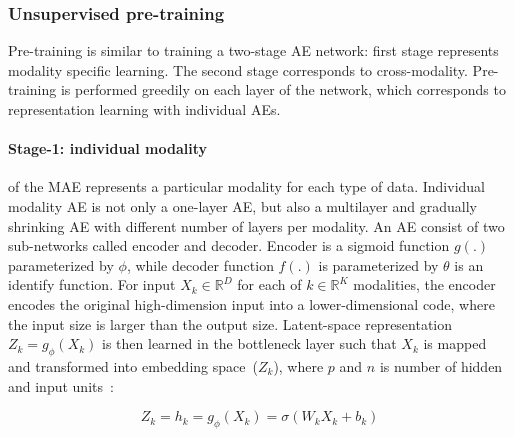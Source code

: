\subsubsection{Unsupervised pre-training} 
Pre-training is similar to training a two-stage AE network: first stage represents modality specific learning. The second stage corresponds to cross-modality. 
Pre-training is performed greedily on each layer of the network, which corresponds to representation learning with individual AEs. 

\paragraph{Stage-1: individual modality}\hspace{-3mm} of the MAE represents a particular modality for each type of data. Individual modality AE is not only a one-layer AE, but also a multilayer and gradually shrinking AE with different number of layers per modality. An AE consist of two sub-networks called encoder and decoder. Encoder is a sigmoid function $g(.)$ parameterized by $\phi$, while decoder function $f(.)$ is   parameterized by $\theta$ is an identify function. For input $X_{k} \in \mathbb{R}^{D}$ for each of $k \in \mathbb{R}^K$ modalities, the encoder encodes the original high-dimension input into a lower-dimensional code, where the input size is larger than the output size. Latent-space representation $Z_k=g_{\phi}(X_{k})$ is then learned in the bottleneck layer such that $X_{k}$ is mapped and transformed into embedding space~($Z_k$), where $p$ and $n$ is number of hidden and input units~\cite{mmdcae}: 

\begin{equation}
    Z_k = h_{k}=g_\phi \left({X}_{k}\right)=\sigma\left(W_{k} X_{k}+b_{k}\right)
\end{equation}

